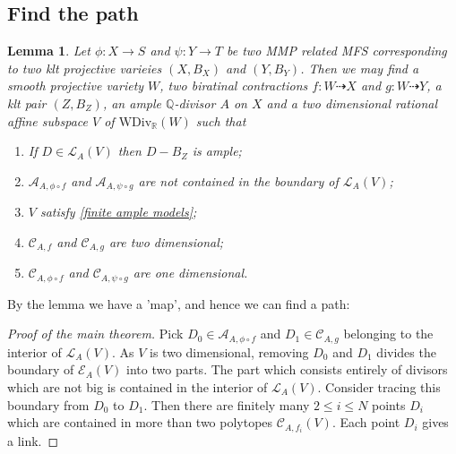\documentclass{article}
\newtheorem{lem}[defn]{Lemma}
\begin{document}

\subsection{Find the path}
\begin{lem}
Let $ \phi:X\to S $ and $ \psi :Y\to T  $ be two MMP related MFS corresponding to two klt projective varieies $ (X,B_X) $ and $ (Y,B_Y) $. Then we may find a smooth projective variety $ W $, two biratinal contractions $ f:W\dashrightarrow X $ and $ g:W\dashrightarrow Y $, a klt pair $ (Z,B_Z) $, an ample $ \mathbb{Q} $-divisor $ A $ on $ X $ and a two dimensional rational affine subspace $ V $ of $ \mathrm{WDiv}_\mathbb{R}(W) $ such that
\begin{enumerate}[1)]
\item If $ D\in \mathcal{L}_A(V) $ then $ D-B_Z $ is ample;
\item $ \mathcal{A}_{A,\phi\circ f} $ and $ \mathcal{A}_{A,\psi\circ g} $ are not contained in the boundary of $ \mathcal{L}_A(V) $;
\item $ V $ satisfy \ref{finite ample models};
\item $ \mathcal{C}_{A,f} $ and $ \mathcal{C}_{A,g} $ are two dimensional;
\item $ \mathcal{C}_{A,\phi\circ f} $ and $ \mathcal{C}_{A,\psi\circ g} $ are one dimensional.
\end{enumerate}
\end{lem}

By the lemma we have a 'map', and hence we can find a path:

\begin{proof}[Proof of the main theorem]
Pick $ D_0\in \mathcal{A}_{A,\phi\circ f} $  and $ D_1\in \mathcal{C}_{A,g} $ belonging to the interior of $ \mathcal{L}_A(V) $. As $ V $ is two dimensional, removing $ D_0 $ and $ D_1 $ divides the boundary of $ \mathcal{E}_A(V) $ into two parts. The part which consists entirely of divisors which are not big is contained in the interior of $ \mathcal{L}_A(V) $. Consider tracing this boundary from $ D_0 $ to $ D_1 $. Then there are finitely many $ 2\leqslant i\leqslant N $ points $ D_i $ which are contained in more than two polytopes $ \mathcal{C}_{A,f_i}(V) $. Each point $ D_i $ gives a link.
\end{proof}
\end{document}
